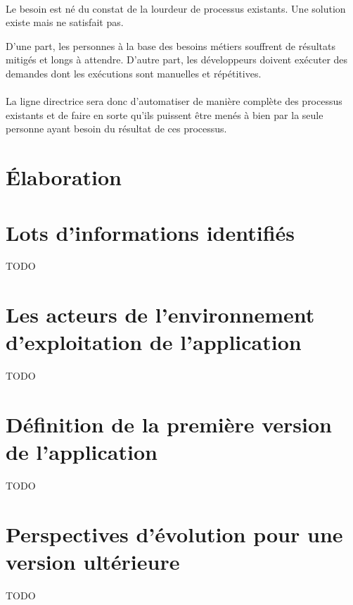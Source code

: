 \paragraph{}
Le besoin est né du constat de la lourdeur de processus existants.
Une solution existe mais ne satisfait pas.

D'une part, les personnes à la base des besoins métiers souffrent de résultats mitigés et longs à attendre.
D'autre part, les développeurs doivent exécuter des demandes dont les exécutions sont manuelles et répétitives.

\paragraph{}
La ligne directrice sera donc d'automatiser de manière complète des processus existants et de faire en sorte qu'ils
puissent être menés à bien par la seule personne ayant besoin du résultat de ces processus.

\section{Élaboration}
\label{sec:elaboration}

    

\section{Lots d'informations identifiés}
\label{sec:identified-information-packages}

    TODO

\section{Les acteurs de l'environnement d'exploitation de l'application}
\label{sec:application-operation-actors}

    TODO

\section{Définition de la première version de l'application}
\label{sec:first-version-definition}

    TODO

\section{Perspectives d'évolution pour une version ultérieure}
\label{sec:future-release-outlook}

    TODO
